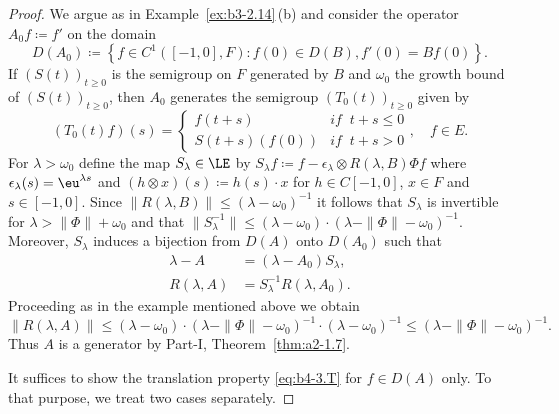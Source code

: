 \begin{proof} 
We argue as in Example~\ref{ex:b3-2.14}\,(b) and consider the operator $A_{0}f  \coloneq  f'$ on the domain 
\[
D(A_{0})  \coloneq  \left\{f \in C^1([-1,0],F) \colon f(0) \in D(B), f'(0) = Bf(0)\right\} .
\]
If\/ $(S(t))_{t\geq 0}$ is the semigroup on $F$ generated by $B$ and $\omega_0$ the growth bound of\/ $(S(t))_{t\geq 0}$, then $A_{0}$ generates the semigroup $(T_{0}(t))_{t\geq 0}$ given by
\[
(T_{0}(t)f)(s) = \begin{cases}
	f(t+s) & \textit{if } \ t+s \leq 0 \\
	S(t+s)(f(0)) & \textit{if } \ t+s  >  0
\end{cases}, \quad f \in E .
\]
For $\lambda  >  \omega_0$ define the map $S_{\lambda} \in \LE$ by $S_{\lambda}f  \coloneq  f - \epsilon_{\lambda}\otimes R(\lambda,B)\Phi f$ where $\epsilon_{\lambda}(s) = \eu^{\lambda s}$ and $(h\otimes x)(s)  \coloneq  h(s)\cdot x$ for $h \in C[-1,0]$, $x \in F$ and $s \in [-1,0]$.
Since $\|R(\lambda,B)\| \leq (\lambda-\omega_0)^{-1}$ it follows that $S_{\lambda}$ is invertible for $\lambda  >  \|\Phi\| + \omega_0$ and that $\|S_{\lambda}^{-1}\| \leq (\lambda-\omega_0)\cdot(\lambda-\|\Phi\|-\omega_0)^{-1}$.
Moreover, $S_{\lambda}$ induces a bijection from $D(A)$ onto $D(A_{0})$ such that
\begin{equation}\label{eq:b4-3.2}
	\begin{aligned}
		\lambda - A &= (\lambda - A_{0})S_{\lambda} , \\
		R(\lambda,A) &= S_{\lambda}^{-1}R(\lambda,A_{0}) .
	\end{aligned}
\end{equation}
Proceeding as in the example mentioned above we obtain
\[\|R(\lambda,A)\| \leq (\lambda - \omega_0)\cdot(\lambda - \|\Phi\| - \omega_0)^{-1}\cdot(\lambda - \omega_0)^{-1} \leq (\lambda - \|\Phi\| - \omega_0)^{-1}.\]
Thus $A$ is a generator by Part-I, Theorem~\ref{thm:a2-1.7}.

It suffices to show the translation property \eqref{eq:b4-3.T} for $f \in D(A)$ only.
To that purpose, we treat two cases separately.


\end{proof}
